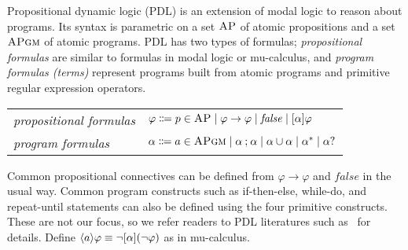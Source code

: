 \documentclass[letter,12pt]{article}
\newcommand{\imp}{\to}
\newcommand{\AP}{\textsc{AP}}
\newcommand{\APgm}{\textsc{APgm}}
\newcommand{\false}{\mathit{false}}
\DeclarePairedDelimiter{\angleBraces}{\langle}{\rangle}
\newcommand{\PDLseq}{\mathbin{;}}
\newcommand{\PDLunion}{\mathbin{\cup}}
\newcommand{\PDLstar}{^*}
\newcommand{\PDLquestion}{{?}}
\begin{document}
Propositional dynamic logic (PDL) is an extension of modal logic
to reason about programs.
Its syntax is parametric on a set $\AP$ of atomic propositions
and a set $\APgm$ of atomic programs.
PDL has two types of formulas;
\emph{propositional formulas} are similar to formulas in modal logic or mu-calculus,
and \emph{program formulas (terms)} represent programs built from atomic programs
and primitive regular expression operators.
\begin{center}
\begin{tabular}{ll}
\emph{propositional formulas} &
$\varphi \Coloneqq
p \in \AP \mid
\varphi \to \varphi \mid
\false \mid
[\alpha] \varphi$
\\
\emph{program formulas} &
$\alpha \Coloneqq
a \in \APgm \mid
\alpha \PDLseq \alpha \mid
\alpha \PDLunion \alpha \mid
\alpha \PDLstar \mid
\alpha \PDLquestion $
\end{tabular}
\end{center}
Common propositional connectives can be defined
from $\varphi \imp \varphi$ and $\false$ in the usual way.
Common program constructs such as if-then-else,
while-do, and repeat-until statements can also be defined using the four primitive constructs.
These are not our focus, so we refer readers to PDL literatures such as~\cite{bibid}
for details.
Define $\angleBraces{a} \varphi \equiv \neg [\alpha] (\neg \varphi)$ as in mu-calculus.
\end{document}
